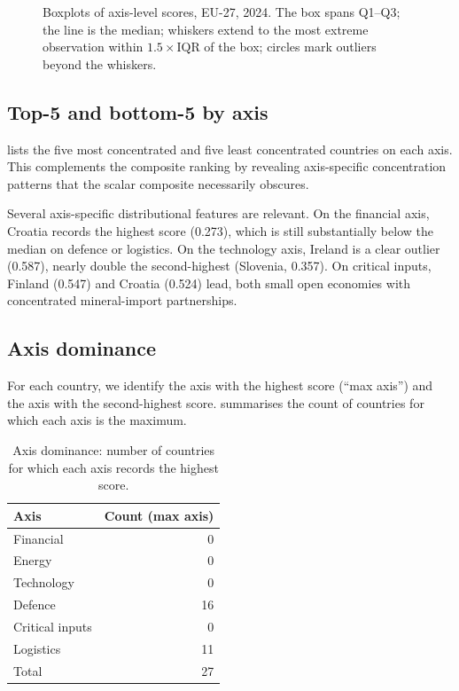 \begin{figure}[htbp]
\centering

\caption{Boxplots of axis-level scores, EU-27, 2024.  The box spans
  Q1--Q3; the line is the median; whiskers extend to the most extreme
  observation within $1.5 \times \text{IQR}$ of the box; circles mark
  outliers beyond the whiskers.}
\label{fig:boxplots}
\end{figure}

\subsection{Top-5 and bottom-5 by axis}

 lists the five most concentrated and five
least concentrated countries on each axis.  This complements the
composite ranking by revealing axis-specific concentration patterns
that the scalar composite necessarily obscures.



Several axis-specific distributional features are relevant.  On the financial
axis, Croatia records the highest score (0.273), which is still
substantially below the median on defence or logistics.  On the
technology axis, Ireland is a clear outlier (0.587), nearly double
the second-highest (Slovenia, 0.357).  On critical inputs, Finland
(0.547) and Croatia (0.524) lead, both small open economies with
concentrated mineral-import partnerships.

\subsection{Axis dominance}\label{sec:axis-dominance}

For each country, we identify the axis with the highest score (``max
axis'') and the axis with the second-highest score.
 summarises the count of countries
for which each axis is the maximum.

\begin{table}[htbp]
\centering
\caption{Axis dominance: number of countries for which each axis
  records the highest score.}
\label{tab:axis-dominance-summary}
\begin{tabular}{@{}lr@{}}
\toprule
\textbf{Axis} & \textbf{Count (max axis)} \\
\midrule
Financial       & 0 \\
Energy          & 0 \\
Technology      & 0 \\
Defence         & 16 \\
Critical inputs & 0 \\
Logistics       & 11 \\
\midrule
Total           & 27 \\
\bottomrule
\end{tabular}
\end{table}

